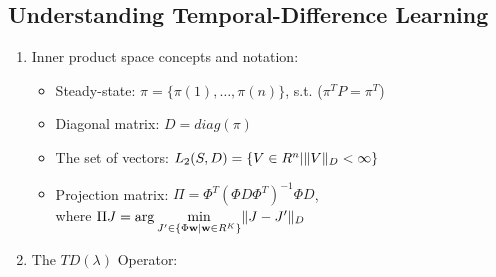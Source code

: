 \subsection{Understanding Temporal-Difference Learning}%
\label{sub:understanding_temporal_difference_learning}

\begin{enumerate}
    \item Inner product space concepts and notation:
        \begin{itemize}
            \item Steady-state: $ \pi = \{ \pi(1), \dots, \pi(n) \} $, s.t. ($ \pi^T P = \pi^T $)
            \item Diagonal matrix: $ D = diag(\pi) $ 
            \item The set of vectors: $ L_2(S, D) = \{ V \in R^n | \Arrowvert V \Arrowvert_D < \infty \} $ 
            \item Projection matrix: $ \Pi = \Phi^T {(\Phi D \Phi^T)}^{-1} \Phi D $,\\
                where
                \quad $ \Pi J = \arg\underset{J' \in \{ \Phi \mathbf{w} | \mathbf{w} \in R^K \}}{\min} 
                \Arrowvert J - J' \Arrowvert_D $ 
        \end{itemize}
    \item The $ TD(\lambda)$ Operator:
\end{enumerate}
